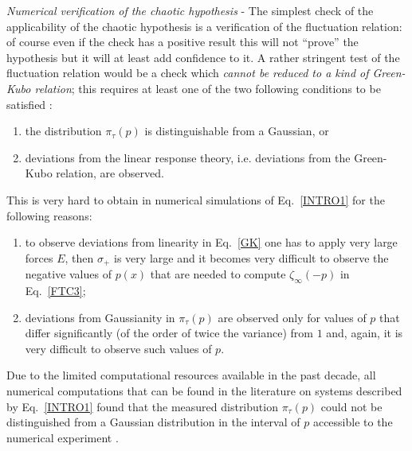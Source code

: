 \documentclass[pre,aps]{revtex4}
\newcommand{\ie}{i.e. }
\begin{document}
\vskip10pt
\noindent
{\it Numerical verification of the chaotic hypothesis} -
The simplest check of the applicability of the chaotic hypothesis
is a verification of the fluctuation relation: of course even if the
check has a positive result this will not ``prove'' the hypothesis but
it will at least add confidence to it. A rather stringent test of the
fluctuation relation would be a check which
{\it cannot be reduced to a kind of Green-Kubo relation}; this  requires
at least one of the two following conditions to be satisfied \cite{ZRA04a,GGZ05}:
\begin{enumerate}
\item the distribution $\pi_\tau(p)$ is distinguishable from a Gaussian, or
\item deviations from the linear response theory, \ie
deviations from the Green-Kubo relation, are observed.
\end{enumerate}
This is very hard to obtain in numerical simulations of 
Eq.~\ref{INTRO1} for the following
reasons:
\begin{enumerate}
\item to observe deviations from linearity in Eq.~\ref{GK} one has to
apply very large forces $E$, then $\sigma_+$ is very large and 
it becomes very difficult
to observe the negative values of $p(x)$ that are needed to 
compute $\zeta_\infty(-p)$ in Eq.~\ref{FTC3};
\item deviations from Gaussianity in $\pi_\tau(p)$ 
are observed only for values of $p$ that
differ significantly (of the order of twice the variance) from $1$ and,
again, it is very difficult
to observe such values of $p$.
\end{enumerate}
Due to the limited computational resources available in the past decade,
all numerical computations that can be found in the literature
on systems described by Eq.~\ref{INTRO1} found that the measured
distribution $\pi_\tau(p)$ could not be 
distinguished from a Gaussian distribution
in the interval of $p$ accessible to the numerical experiment 
\cite{ECM93,BGG97,BCL98,ZRA04a}. 

\vskip10pt
\end{document}

